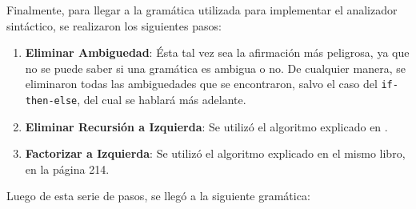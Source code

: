 \documentclass[a4paper,oneside]{report}
\begin{document}
Finalmente, para llegar a la gramática utilizada para implementar el analizador sintáctico, se realizaron los siguientes pasos:
\begin{enumerate}
	\item \textbf{Eliminar Ambiguedad}: Ésta tal vez sea la afirmación más peligrosa, ya que no se puede saber si una gramática es ambigua o no. De cualquier manera, se eliminaron todas las ambiguedades que se encontraron, salvo el caso del \verb|if-then-else|, del cual se hablará más adelante.
	\item \textbf{Eliminar Recursión a Izquierda}: Se utilizó el algoritmo explicado en \cite[pág. 212]{aho}.
	\item \textbf{Factorizar a Izquierda}: Se utilizó el algoritmo explicado en el mismo libro, en la página 214.
\end{enumerate}

Luego de esta serie de pasos, se llegó a la siguiente gramática:
\end{document}
